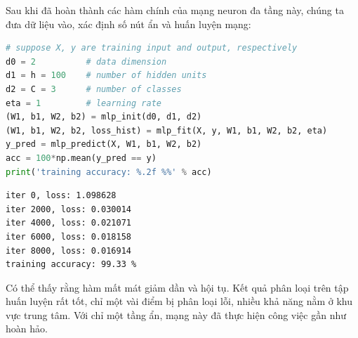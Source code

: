 Sau khi đã hoàn thành các hàm chính của mạng neuron đa tầng này, chúng ta
đưa dữ liệu vào, xác định số nút ẩn và huấn luyện mạng:
\begin{lstlisting}[language=Python]
# suppose X, y are training input and output, respectively
d0 = 2          # data dimension
d1 = h = 100    # number of hidden units
d2 = C = 3      # number of classes
eta = 1         # learning rate
(W1, b1, W2, b2) = mlp_init(d0, d1, d2)
(W1, b1, W2, b2, loss_hist) = mlp_fit(X, y, W1, b1, W2, b2, eta)
y_pred = mlp_predict(X, W1, b1, W2, b2)
acc = 100*np.mean(y_pred == y)
print('training accuracy: %.2f %%' % acc)
\end{lstlisting}
\kq
\begin{lstlisting}
iter 0, loss: 1.098628
iter 2000, loss: 0.030014
iter 4000, loss: 0.021071
iter 6000, loss: 0.018158
iter 8000, loss: 0.016914
training accuracy: 99.33 %
\end{lstlisting}
Có thể thấy rằng hàm mất mát giảm dần và hội tụ. Kết quả phân loại trên tập
huấn luyện rất tốt, chỉ một vài điểm bị phân loại lỗi, nhiều khả năng nằm
ở khu vực trung tâm. Với chỉ một tầng ẩn, mạng này đã thực hiện công việc
gần như hoàn hảo.
